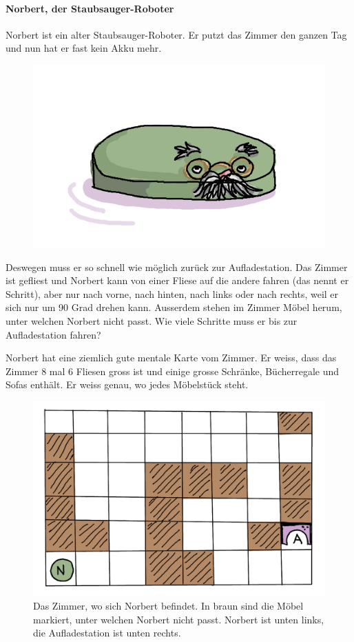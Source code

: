 \paragraph{Norbert, der Staubsauger-Roboter}\label{norbert}
Norbert ist ein alter Staubsauger-Roboter. Er putzt das Zimmer den ganzen Tag und nun hat er fast kein Akku mehr.
\begin{figure}
\includegraphics[width=0.9\linewidth]{Pictures/SP/norbert.png} 
\label{fig:norbert}
\end{figure}
Deswegen muss er so schnell wie möglich zurück zur Aufladestation.
Das Zimmer ist gefliest und Norbert kann von einer Fliese auf die andere fahren (das nennt er Schritt), aber nur nach vorne, nach hinten, nach links oder nach rechts, weil er sich nur um 90 Grad drehen kann. Ausserdem stehen im Zimmer Möbel herum, unter welchen Norbert nicht passt. Wie viele Schritte muss er bis zur Aufladestation fahren?

Norbert hat eine ziemlich gute mentale Karte vom Zimmer. Er weiss, dass das Zimmer 8 mal 6 Fliesen gross ist und einige grosse Schränke, Bücherregale und Sofas enthält. Er weiss genau, wo jedes Möbelstück steht.
\begin{figure}[H]
    \centering
    \includegraphics[width=\textwidth]{Pictures/SP/norbert_zimmer.png}
    \caption{Das Zimmer, wo sich Norbert befindet. In braun sind die Möbel markiert, unter welchen Norbert nicht passt. Norbert ist unten links, die Aufladestation ist unten rechts.}
    \label{fig:norbert_zimmer}
\end{figure}

